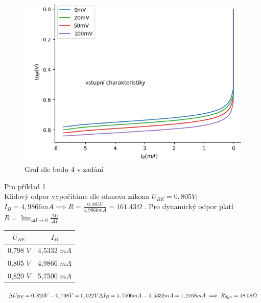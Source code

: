\documentclass[a4paper]{article}
\begin{document}
\begin{figure}[H]
\begin{minipage}[b]{0.48\textwidth}
		\includegraphics[width=\textwidth]{Figure_1.png}
	\end{minipage}
	\hfill
	\begin{minipage}[b]{0.45\textwidth}
		\hfill
	\end{minipage}
	\caption{Graf dle bodu 4 v zadání}
\end{figure}
Pro příklad 1\\
Klidový odpor vypočítáme dle ohmova zákona
$U_{BE} =0,805  V $; $I_B = 4,9866 mA  \implies R = \frac{0,805 V}{4,9866 mA} = 161.43 \Omega $%
. Pro dynamický odpor platí $R =\lim_{\Delta I \to 0}  \frac{\Delta U}{\Delta I}$\\
\begin{minipage}{0.3\textwidth}
\begin{tabular}{|c|c|} 
	\hline
	$U_{BE}$ & $I_B$ \\ \hline
	0,798 $V$ & 4,5332 $mA$ \\ 
	0,805 $V$ & 4,9866 $mA$ \\ 
	0,820 $V$ & 5,7500 $mA$ \\ 
	\hline
\end{tabular}
\end{minipage}
\begin{minipage}{0.6\textwidth}
\begin{math}
	\Delta U_{BE} =0,820 V - 0,798 V = 0,022V \\
	\Delta I_B =5,7500 mA- 4,5332 mA = 1,2168 mA \\
	\implies R_{dyn} = \SI{18,08}{\ohm}\\
\end{math}\\
\end{minipage}\\
\end{document}
